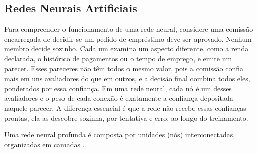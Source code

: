 \subsection{Redes Neurais Artificiais}

Para compreender o funcionamento de uma rede neural, considere uma comissão encarregada de
decidir se um pedido de empréstimo deve ser aprovado. Nenhum membro decide sozinho. Cada um
examina um aspecto diferente, como a renda declarada, o histórico de pagamentos ou o tempo de
emprego, e emite um parecer. Esses pareceres não têm todos o
mesmo valor, pois a comissão confia mais em uns avaliadores do que em outros, e a decisão
final combina todos eles, ponderados por essa confiança. Em uma rede neural, cada nó é um
desses avaliadores e o peso de cada conexão é exatamente a confiança depositada naquele
parecer. A diferença essencial é que a rede não recebe essas confianças prontas, ela as
descobre sozinha, por tentativa e erro, ao longo do treinamento.

Uma rede neural profunda é composta por unidades (nós) interconectadas, organizadas em camadas
\cite{Goodfellow2016,NielsenNNDL2015}.

